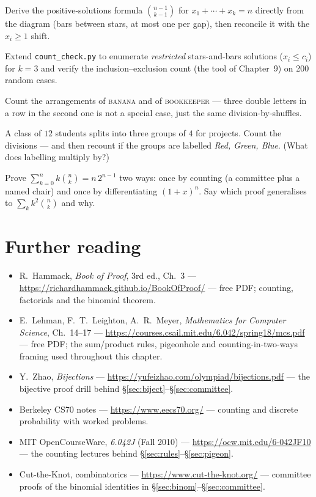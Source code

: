 \begin{exercise}[hard]
Derive the positive-solutions formula $\binom{n-1}{k-1}$ for
$x_1 + \cdots + x_k = n$ directly from the diagram (bars between stars,
at most one per gap), then reconcile it with the $x_i \ge 1$ shift.
\end{exercise}
\begin{exercise}[hard]
Extend \texttt{count\_check.py} to enumerate \emph{restricted}
stars-and-bars solutions ($x_i \le c_i$) for $k = 3$ and verify the
inclusion--exclusion count (the tool of Chapter~9) on 200 random cases.
\end{exercise}
\begin{exercise}[easy]
Count the arrangements of \textsc{banana} and of \textsc{bookkeeper} ---
three double letters in a row in the second one is not a special case,
just the same division-by-shuffles.
\end{exercise}
\begin{exercise}[medium]
A class of $12$ students splits into three groups of $4$ for projects.
Count the divisions --- and then recount if the groups are labelled
\emph{Red, Green, Blue}. (What does labelling multiply by?)
\end{exercise}
\begin{exercise}[hard]
Prove $\sum_{k=0}^{n} k\binom{n}{k} = n\,2^{n-1}$ two ways: once by
counting (a committee plus a named chair) and once by differentiating
$(1+x)^n$. Say which proof generalises to $\sum_k k^2\binom{n}{k}$ and why.
\end{exercise}

\section*{Further reading}
\begin{itemize}
\item R.~Hammack, \emph{Book of Proof}, 3rd ed., Ch.~3 ---
\url{https://richardhammack.github.io/BookOfProof/} --- free PDF;
counting, factorials and the binomial theorem.
\item E.~Lehman, F.~T.~Leighton, A.~R.~Meyer, \emph{Mathematics for
Computer Science}, Ch.~14--17 ---
\url{https://courses.csail.mit.edu/6.042/spring18/mcs.pdf} --- free PDF;
the sum/product rules, pigeonhole and counting-in-two-ways framing used
throughout this chapter.
\item Y.~Zhao, \emph{Bijections} ---
\url{https://yufeizhao.com/olympiad/bijections.pdf} --- the bijective
proof drill behind \S\ref{sec:biject}--\S\ref{sec:committee}.
\item Berkeley CS70 notes ---
\url{https://www.eecs70.org/} --- counting and discrete probability with
worked problems.
\item MIT OpenCourseWare, \emph{6.042J} (Fall 2010) ---
\url{https://ocw.mit.edu/6-042JF10} --- the counting lectures behind
\S\ref{sec:rules}--\S\ref{sec:pigeon}.
\item Cut-the-Knot, combinatorics ---
\url{https://www.cut-the-knot.org/} --- committee proofs of the binomial
identities in \S\ref{sec:binom}--\S\ref{sec:committee}.
\end{itemize}

